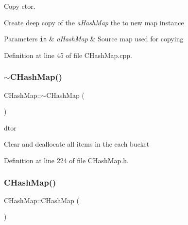 Copy c\textquotesingle{}tor. 

Create deep copy of the {\itshape a\+Hash\+Map} the to new map instance 
\begin{DoxyParams}[1]{Parameters}
\mbox{\tt in}  & {\em a\+Hash\+Map} & Source map used for copying \\
\hline
\end{DoxyParams}


Definition at line 45 of file C\+Hash\+Map.\+cpp.

\mbox{\label{class_c_hash_map_a74397f8f7751a170e3712d680a86de75}} 
\subsubsection{\texorpdfstring{$\sim$\+C\+Hash\+Map()}{~CHashMap()}}
{\footnotesize\ttfamily C\+Hash\+Map\+::$\sim$\+C\+Hash\+Map (\begin{DoxyParamCaption}{ }\end{DoxyParamCaption})\hspace{0.3cm}{\ttfamily [inline]}}



d\textquotesingle{}tor 

Clear and deallocate all items in the each bucket 

Definition at line 224 of file C\+Hash\+Map.\+h.

\mbox{\label{class_c_hash_map_a6640595075ccee64690e0ecaf9b4d4be}} 
\subsubsection{\texorpdfstring{C\+Hash\+Map()}{CHashMap()}\hspace{0.1cm}{\footnotesize\ttfamily [3/3]}}
{\footnotesize\ttfamily C\+Hash\+Map\+::\+C\+Hash\+Map (\begin{DoxyParamCaption}\item[{\hyperlink{class_c_hash_map}{C\+Hash\+Map} \&\&}]{ }\end{DoxyParamCaption})\hspace{0.3cm}{\ttfamily [default]}}



